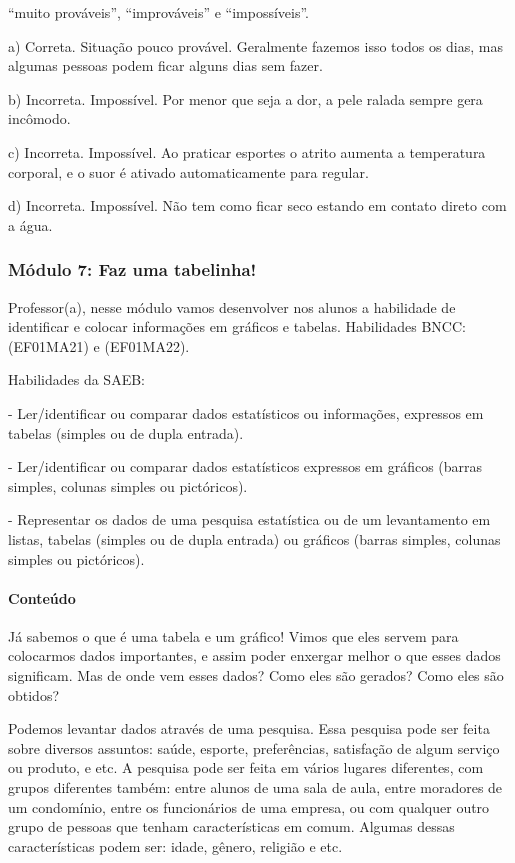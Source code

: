 ``muito prováveis'', ``improváveis'' e ``impossíveis''.

a) Correta. Situação pouco provável. Geralmente fazemos isso todos os
dias, mas algumas pessoas podem ficar alguns dias sem fazer.

b) Incorreta. Impossível. Por menor que seja a dor, a pele ralada sempre
gera incômodo.

c) Incorreta. Impossível. Ao praticar esportes o atrito aumenta a
temperatura corporal, e o suor é ativado automaticamente para regular.

d) Incorreta. Impossível. Não tem como ficar seco estando em contato
direto com a água.

\subsubsection{Módulo 7: Faz uma tabelinha!
}\label{muxf3dulo-7-faz-uma-tabelinha}

Professor(a), nesse módulo vamos desenvolver nos alunos a habilidade de
identificar e colocar informações em gráficos e tabelas. Habilidades
BNCC: (EF01MA21) e (EF01MA22).

Habilidades da SAEB:

- Ler/identificar ou comparar dados estatísticos ou informações,
expressos em tabelas (simples ou de dupla entrada).

- Ler/identificar ou comparar dados estatísticos expressos em gráficos
(barras simples, colunas simples ou pictóricos).

- Representar os dados de uma pesquisa estatística ou de um levantamento
em listas, tabelas (simples ou de dupla entrada) ou gráficos (barras
simples, colunas simples ou pictóricos).

\paragraph{Conteúdo}\label{conteuxfado-6}

Já sabemos o que é uma tabela e um gráfico! Vimos que eles servem para
colocarmos dados importantes, e assim poder enxergar melhor o que esses
dados significam. Mas de onde vem esses dados? Como eles são gerados?
Como eles são obtidos?

Podemos levantar dados através de uma pesquisa. Essa pesquisa pode ser
feita sobre diversos assuntos: saúde, esporte, preferências, satisfação
de algum serviço ou produto, e etc. A pesquisa pode ser feita em vários
lugares diferentes, com grupos diferentes também: entre alunos de uma
sala de aula, entre moradores de um condomínio, entre os funcionários de
uma empresa, ou com qualquer outro grupo de pessoas que tenham
características em comum. Algumas dessas características podem ser:
idade, gênero, religião e etc.


